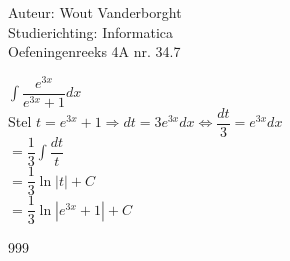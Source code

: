 \documentclass[a4paper]{article}
\newcommand{\Int}{\displaystyle\int}
\begin{document}
  
\noindent \large Auteur: Wout Vanderborght\\
\noindent \large Studierichting: Informatica\\
\noindent \large Oefeningenreeks 4A nr. 34.7\\

\medskip

\normalsize

$ \Int \dfrac{e^{3x}}{e^{3x}+ 1}dx $ \\

Stel $t = e^{3x}+1 \Rightarrow dt = 3e^{3x}dx \Leftrightarrow \dfrac{dt}{3} = e^{3x}dx $\\

$ = \dfrac{1}{3} \Int \dfrac{dt}{t} $ \\

$ = \dfrac{1}{3} \ln|t| + C $ \\

$ = \dfrac{1}{3} \ln|e^{3x}+1| + C $ \\

\begin{thebibliography}{999}
\end{thebibliography}
\end{document}

